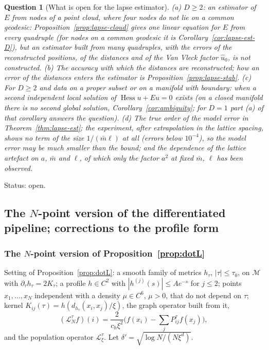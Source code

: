 \documentclass[11pt,a4paper]{article}
\theoremstyle{stmt}
\theoremstyle{defn}
\theoremstyle{rmk}
\newtheorem{question}[theorem]{Question}
\numberwithin{equation}{section}
\newcommand{\status}[1]{\par\noindent\textsf{\small Status: #1}\par}
\newcommand{\M}{\mathcal{M}}
\newcommand{\Lc}{\mathcal{L}}
\begin{document}
{\begin{question}[What is open for the lapse estimator]\label{q:b1}
\textup{(a)} $D\ge2$: an estimator of $E$ from nodes of a point cloud, where four nodes do not lie on a common geodesic: Proposition~\ref{prop:lapse-cloud} gives one linear equation for $E$ from every quadruple (for nodes on a common geodesic it is Corollary~\ref{cor:lapse-est-D}), but an estimator built from many quadruples, with the errors of the reconstructed positions, of the distances and of the Van Vleck factor $\hat u_0$, is not constructed. \textup{(b)} The accuracy with which the distances are reconstructed; how an error of the distances enters the estimator is Proposition~\ref{prop:lapse-stab}. \textup{(c)} For $D\ge2$ and data on a proper subset or on a manifold with boundary: when a second independent local solution of $\operatorname{Hess}u+Eu=0$ exists (on a closed manifold there is no second global solution, Corollary~\ref{cor:ambiguity}; for $D=1$ part (a) of that corollary answers the question). \textup{(d)} The true order of the model error in Theorem~\ref{thm:lapse-est}; the experiment, after extrapolation in the lattice spacing, shows no term of the size $1/(\bar m\ell)$ at all (errors below $10^{-4}$), so the model error may be much smaller than the bound; and the dependence of the lattice artefact on $a$, $\bar m$ and $\ell$, of which only the factor $a^2$ at fixed $\bar m$, $\ell$ has been observed.
\end{question}
\status{open.}

\subsection{The $N$-point version of the differentiated pipeline; corrections to the profile form}\label{sec:t-npoint}

\subsubsection{The $N$-point version of Proposition~\ref{prop:dotL}}

Setting of Proposition~\ref{prop:dotL}: a smooth family of metrics $h_\tau$, $|\tau|\le\tau_0$, on $\M$ with $\partial_\tau h_\tau=2K_\tau$; a profile $h\in C^2$ with $|h^{(j)}(s)|\le Ae^{-s}$ for $j\le2$; points $x_1,\dots,x_N$ independent with a density $\mu\in C^6$, $\mu>0$, that do not depend on $\tau$; kernel $K_{ij}(\tau)=h(d_{h_\tau}(x_i,x_j)/\xi)$, the graph operator built from it,
\[
(\Lc_N^\tau f)(i)=\frac{2}{c_h\xi^2}\Big(f(x_i)-\sum_jP^\tau_{ij}f(x_j)\Big),
\]
and the population operator $\Lc^\tau_\xi$. Let $\delta'=\sqrt{\log N/(N\xi^d)}$.

}
\end{document}
